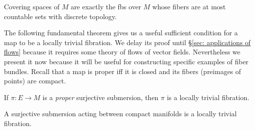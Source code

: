 \begin{example}
    Covering spaces of $M$ are exactly the \glspl{fb} over $M$ whose fibers are at most countable sets with discrete topology.
\end{example}

The following fundamental theorem gives us a useful sufficient condition for a map to be a locally trivial fibration. We delay its proof until \S\ref{sec: applications of flows} because it requires some theory of flows of vector fields. Nevertheless we present it now because it will be useful for constructing specific examples of fiber bundles. Recall that a map is proper iff it is closed and its fibers (preimages of points) are compact.

\begin{thm}\label{thm Ehresmann}
    If $\pi:E\to M$ is a \emph{proper} surjective submersion, then $\pi$ is a locally trivial fibration.
\end{thm}

\begin{cor}
    A surjective submersion acting between compact manifolds is a locally trivial fibration.
\end{cor}


